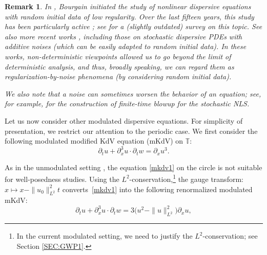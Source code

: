 \documentclass[letterpaper, 11pt,  reqno]{amsart}
\newtheorem{remark}[theorem]{Remark}
\newcommand{\1}{\hspace{0.5mm}\text{I}\hspace{0.5mm}}
\newcommand{\noi}{\noindent}
\newcommand{\T}{\mathbb{T}}
\newcommand{\dx}{\partial_x}
\newcommand{\dt}{\partial_t}
\numberwithin{equation}{section}
\numberwithin{theorem}{section}
\begin{document}
\begin{remark}\label{REM:random1}
\rm
In \cite{BO94, BO96}, Bourgain initiated the study 
of nonlinear dispersive equations with random initial data of low regularity.
Over the last fifteen years, 
this study has been particularly active
\cite{BO96, BT08, CO, BT3, BOP2, Poc, OP};
see \cite{BOP4} for a (slightly outdated) survey on this topic.
See also more recent works
\cite{GKO2, DNY2, OOT1, Bring, OOT2, BDNY}, including those
on stochastic dispersive PDEs with additive noises
(which can be easily adapted to random initial data).
In these works, 
non-deterministic viewpoints
allowed us to go beyond the limit of deterministic analysis, 
and thus, 
broadly speaking, 
we can  regard them as 
regularization-by-noise phenomena
(by considering random initial data). 




We also note that 
a  noise can sometimes  worsen the behavior of an equation; 
see, 
for example, 
\cite{de_bouard_effect_2002, de_bouard_blow-up_2005}
for the construction of 
finite-time blowup  for the stochastic NLS.



\end{remark}














\medskip



Let us now consider other modulated dispersive equations.
For simplicity of presentation, 
we restrict our attention to the periodic case.
We first consider the following
  modulated
 modified KdV equation (mKdV) on $\T$:
\begin{equation}
\label{mkdv1}
\dt u+ \dx^3 u \cdot \dt w=\dx u^3.
\end{equation}



\noi
As in the unmodulated setting \cite{BO93}, 
the equation \eqref{mkdv1} on the circle is not suitable 
for well-posedness studies.
Using the $L^2$-conservation,\footnote{In the current modulated setting, 
we need to justify the $L^2$-conservation; see Section \ref{SEC:GWP1}.} 
the gauge transform: $x \mapsto x -\|u_0\|_{L^2}^2 t$
converts~\eqref{mkdv1}
into the  following renormalized modulated mKdV:
\begin{equation}
\label{mkdv2}
\dt u+   \dx^3 u \cdot \dt w=3   \big(u^2- \|u\|_{L^2}^2\big)\dx u, 
\end{equation}
\end{document}

